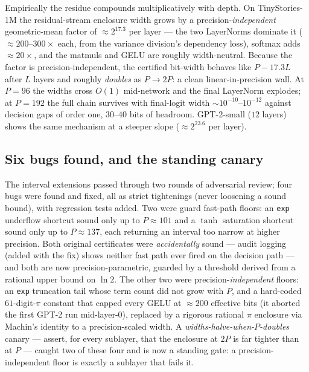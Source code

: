 \documentclass[11pt,a4paper]{article}
\begin{document}
Empirically the residue compounds multiplicatively with depth. On TinyStories-1M the residual-stream enclosure width grows by a precision-\emph{independent} geometric-mean factor of \(\approx 2^{17.3}\) per layer --- the two LayerNorms dominate it (\(\approx 200\text{--}300\times\) each, from the variance division's dependency loss), softmax adds \(\approx 20\times\), and the matmuls and GELU are roughly width-neutral. Because the factor is precision-independent, the certified bit-width behaves like \(P - 17.3L\) after \(L\) layers and roughly \emph{doubles} as \(P \to 2P\): a clean linear-in-precision wall. At \(P = 96\) the widths cross \(O(1)\) mid-network and the final LayerNorm explodes; at \(P = 192\) the full chain survives with final-logit width \(\sim 10^{-10}\text{--}10^{-12}\) against decision gaps of order one, \(30\text{--}40\) bits of headroom. GPT-2-small (\(12\) layers) shows the same mechanism at a steeper slope (\(\approx 2^{23.6}\) per layer).

\subsection{Six bugs found, and the standing canary}

The interval extensions passed through two rounds of adversarial review; four bugs were found and fixed, all as strict tightenings (never loosening a sound bound), with regression tests added. Two were guard fast-path floors: an \texttt{exp} underflow shortcut sound only up to \(P \approx 101\) and a \(\tanh\) saturation shortcut sound only up to \(P \approx 137\), each returning an interval too narrow at higher precision. Both original certificates were \emph{accidentally} sound --- audit logging (added with the fix) shows neither fast path ever fired on the decision path --- and both are now precision-parametric, guarded by a threshold derived from a rational upper bound on \(\ln 2\). The other two were precision-\emph{independent} floors: an \texttt{exp} truncation tail whose term count did not grow with \(P\), and a hard-coded \(61\)-digit-\(\pi\) constant that capped every GELU at \(\approx 200\) effective bits (it aborted the first GPT-2 run mid-layer-0), replaced by a rigorous rational \(\pi\) enclosure via Machin's identity to a precision-scaled width. A \emph{widths-halve-when-\(P\)-doubles} canary --- assert, for every sublayer, that the enclosure at \(2P\) is far tighter than at \(P\) --- caught two of these four and is now a standing gate: a precision-independent floor is exactly a sublayer that fails it.
\end{document}
